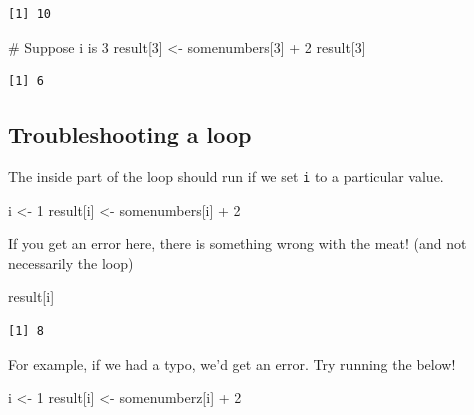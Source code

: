 \documentclass[
  letterpaper,
  DIV=11,
  numbers=noendperiod]{scrreprt}
\newenvironment{Shaded}{\begin{snugshade}}{\end{snugshade}}
\newcommand{\CommentTok}[1]{\textcolor[rgb]{0.37,0.37,0.37}{#1}}
\newcommand{\DecValTok}[1]{\textcolor[rgb]{0.68,0.00,0.00}{#1}}
\newcommand{\NormalTok}[1]{\textcolor[rgb]{0.00,0.23,0.31}{#1}}
\newcommand{\OtherTok}[1]{\textcolor[rgb]{0.00,0.23,0.31}{#1}}
\newcommand{\SpecialCharTok}[1]{\textcolor[rgb]{0.37,0.37,0.37}{#1}}
\begin{document}
\begin{verbatim}
[1] 10
\end{verbatim}

\begin{Shaded}
\begin{Highlighting}[]
\CommentTok{\# Suppose i is 3}
\NormalTok{result[}\DecValTok{3}\NormalTok{] }\OtherTok{\textless{}{-}}\NormalTok{ somenumbers[}\DecValTok{3}\NormalTok{] }\SpecialCharTok{+} \DecValTok{2}
\NormalTok{result[}\DecValTok{3}\NormalTok{]}
\end{Highlighting}
\end{Shaded}

\begin{verbatim}
[1] 6
\end{verbatim}

\hypertarget{troubleshooting-a-loop}{%
\subsection{Troubleshooting a loop}\label{troubleshooting-a-loop}}

The inside part of the loop should run if we set \texttt{i} to a
particular value.

\begin{Shaded}
\begin{Highlighting}[]
\NormalTok{i }\OtherTok{\textless{}{-}} \DecValTok{1}
\NormalTok{result[i] }\OtherTok{\textless{}{-}}\NormalTok{ somenumbers[i] }\SpecialCharTok{+} \DecValTok{2}
\end{Highlighting}
\end{Shaded}

If you get an error here, there is something wrong with the meat! (and
not necessarily the loop)

\begin{Shaded}
\begin{Highlighting}[]
\NormalTok{result[i]}
\end{Highlighting}
\end{Shaded}

\begin{verbatim}
[1] 8
\end{verbatim}

For example, if we had a typo, we'd get an error. Try running the below!

\begin{Shaded}
\begin{Highlighting}[]
\NormalTok{i }\OtherTok{\textless{}{-}} \DecValTok{1}
\NormalTok{result[i] }\OtherTok{\textless{}{-}}\NormalTok{ somenumberz[i] }\SpecialCharTok{+} \DecValTok{2}
\end{Highlighting}
\end{Shaded}
\end{document}
